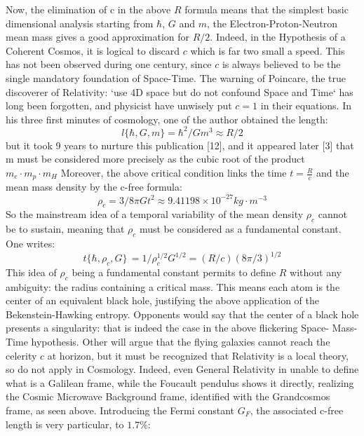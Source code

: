 \documentclass[twoside,draft]{article}
\begin{document}
\begin{sloppypar}
{Now, the elimination of c in the above $R$ formula means that the simplest basic dimensional
analysis starting from $\hbar$, $G$ and $m$, the Electron-Proton-Neutron mean mass gives a good
approximation for $R/2$. Indeed, in the Hypothesis of a Coherent Cosmos, it is logical to discard $c$
which is far two small a speed. This has not been observed during one century, since $c$ is always
believed to be the single mandatory foundation of Space-Time. The warning of Poincare, the true
discoverer of Relativity: `use 4D space but do not confound Space and Time` has long been
forgotten, and physicist have unwisely put $c = 1$ in their equations.
In his three first minutes of cosmology, one of the author obtained the length:
\begin{equation}
l \{\hbar,G,m\} = \hbar^{2} /Gm^{3} \approx R/2
\end{equation}
but it took 9 years to nurture this publication [12], and it appeared later [3] that m must be considered more precisely as the cubic root of the product 
$
m_{e} \cdot m_{p} \cdot m_{H}$
Moreover, the above critical condition
links the time $t = \frac{R}{c}$ and the mean mass density by the c-free formula:
\begin{equation}
\rho_{c} = 3/8\pi Gt^{2} \approx 9.41198 \times 10^{-27} kg \cdot m^{-3}
\end{equation}
So the mainstream idea of a temporal variability of the mean density $\rho_{c}$ cannot be to
sustain, meaning that $\rho_{c}$ must be considered as a fundamental constant. One writes:
\begin{equation}
t\{\hbar,\rho_{c} ,G\}\, = 1/\rho_{c}^{1/2} G^{1/2} = (R/c) (8\pi/3)^{1/2}
\end{equation}
This idea of $\rho_{c}$ being a fundamental constant permits to define $R$ without any ambiguity: the
radius containing a critical mass. This means each atom is the center of an equivalent black hole,
justifying the above application of the Bekenstein-Hawking entropy. Opponents would say that the
center of a black hole presents a singularity: that is indeed the case in the above flickering Space-
Mass-Time hypothesis. Other will argue that the flying galaxies cannot reach the celerity $c$ at
horizon, but it must be recognized that Relativity is a local theory, so do not apply in Cosmology.
Indeed, even General Relativity in unable to define what is a Galilean frame, while the Foucault
pendulus shows it directly, realizing the Cosmic Microwave Background frame, identified with the
Grandcosmos frame, as seen above.
Introducing the Fermi constant $G_{F}$, the associated c-free length is very particular, to $1.7\%$:
}
\end{sloppypar}
\end{document}
